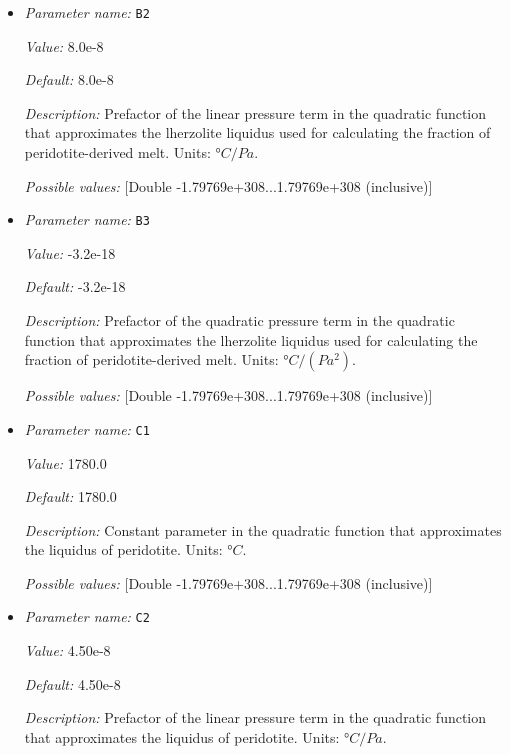 \begin{itemize}
{\it Possible values:} [Double -1.79769e+308...1.79769e+308 (inclusive)]
\item {\it Parameter name:} {\tt B2}
\label{parameters:Postprocess/Visualization/Melt fraction/B2}


{\it Value:} 8.0e-8


{\it Default:} 8.0e-8


{\it Description:} Prefactor of the linear pressure term in the quadratic function that approximates the  lherzolite liquidus used for calculating the fraction of peridotite-derived melt. Units: $°C/Pa$.


{\it Possible values:} [Double -1.79769e+308...1.79769e+308 (inclusive)]
\item {\it Parameter name:} {\tt B3}
\label{parameters:Postprocess/Visualization/Melt fraction/B3}


{\it Value:} -3.2e-18


{\it Default:} -3.2e-18


{\it Description:} Prefactor of the quadratic pressure term in the quadratic function that approximates the  lherzolite liquidus used for calculating the fraction of peridotite-derived melt. Units: $°C/(Pa^2)$.


{\it Possible values:} [Double -1.79769e+308...1.79769e+308 (inclusive)]
\item {\it Parameter name:} {\tt C1}
\label{parameters:Postprocess/Visualization/Melt fraction/C1}


{\it Value:} 1780.0


{\it Default:} 1780.0


{\it Description:} Constant parameter in the quadratic function that approximates the liquidus of peridotite. Units: $°C$.


{\it Possible values:} [Double -1.79769e+308...1.79769e+308 (inclusive)]
\item {\it Parameter name:} {\tt C2}
\label{parameters:Postprocess/Visualization/Melt fraction/C2}


{\it Value:} 4.50e-8


{\it Default:} 4.50e-8


{\it Description:} Prefactor of the linear pressure term in the quadratic function that approximates the liquidus of peridotite. Units: $°C/Pa$.



\end{itemize}
